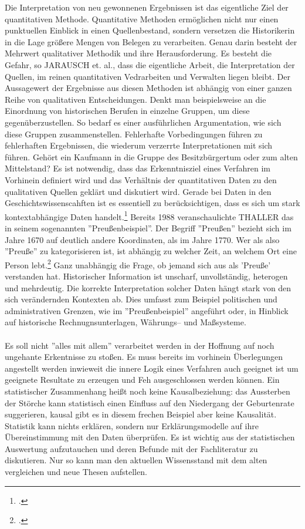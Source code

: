 \documentclass[12pt,a4paper]{article}
\begin{document}
Die Interpretation von neu gewonnenen Ergebnissen ist das eigentliche Ziel der quantitativen Methode. Quantitative Methoden ermöglichen nicht nur einen punktuellen Einblick in einen Quellenbestand, sondern versetzen die Historikerin in die Lage größere Mengen von Belegen zu verarbeiten. Genau darin besteht der Mehrwert qualitativer Methodik und ihre Herausforderung. Es besteht die Gefahr, so JARAUSCH et. al., dass die eigentliche Arbeit, die Interpretation der Quellen, im reinen quantitativen Vedrarbeiten und Verwalten liegen bleibt. Der Aussagewert der Ergebnisse aus diesen Methoden ist abhängig von einer ganzen Reihe von qualitativen Entscheidungen. Denkt man beispielsweise an die Einordnung von historischen Berufen in einzelne Gruppen, um diese gegenüberzustellen. So bedarf es einer ausführlichen Argumentation, wie sich diese Gruppen zusammenstellen. Fehlerhafte  Vorbedingungen führen zu fehlerhaften Ergebnissen, die wiederum verzerrte Interpretationen mit sich führen. Gehört ein Kaufmann in die Gruppe des Besitzbürgertum oder zum alten Mittelstand? Es ist notwendig, dass das Erkenntnisziel eines Verfahren im Vorhinein definiert wird und das Verhältnis der quantitativen Daten zu den qualitativen Quellen geklärt und diskutiert wird. Gerade bei Daten in den Geschichtswissenscahften ist  es essentiell zu berücksichtigen, dass es sich um stark kontextabhängige Daten handelt.\footcite[][S.182-193]{jarausch1985quantitative} Bereits 1988 veranschaulichte THALLER das in seinem sogenannten ''Preußenbeispiel''. Der Begriff ''Preußen'' bezieht sich im Jahre 1670 auf deutlich andere Koordinaten, als im Jahre 1770. Wer als also ''Preuße'' zu kategorisieren ist, ist abhängig zu welcher Zeit, an welchem Ort eine Person lebt.\footcite[][S.264-266]{thaller2017historical} Ganz unabhängig die Frage, ob jemand sich aus als 'Preuße' verstanden hat. Historischer Information ist unscharf, unvollständig, heterogen und mehrdeutig. Die korrekte Interpretation solcher Daten hängt stark von den sich verändernden Kontexten ab. Dies umfasst zum Beispiel politischen und administrativen Grenzen, wie im ''Preußenbeispiel'' angeführt oder, in Hinblick auf historische Rechnugnsunterlagen, Währungs-- und Maßsysteme.
\\
\\
Es soll nicht ''alles mit allem'' verarbeitet werden in der Hoffnung auf noch ungehante Erkentnisse zu stoßen. Es muss bereits im vorhinein Überlegungen angestellt werden inwieweit die innere Logik eines Verfahren auch geeignet ist um geeignete Resultate zu erzeugen und Feh ausgeschlossen werden können. Ein statistischer Zusammenhang heißt noch keine Kausalbeziehung: das Aussterben der Störche kann statistisch einen Einfluss auf den Niedergang der Geburtenrate suggerieren, kausal gibt es in diesem frechen Beispiel aber keine Kausalität. Statistik kann nichts erklären, sondern nur Erklärungsmodelle auf ihre Übereinstimmung mit den Daten überprüfen. Es ist wichtig aus der statistischen Auswertung aufzutauchen und deren Befunde mit der Fachliteratur zu diskutieren. Nur so kann man den aktuellen Wissensstand mit dem alten vergleichen und neue Thesen aufstellen.
\end{document}
